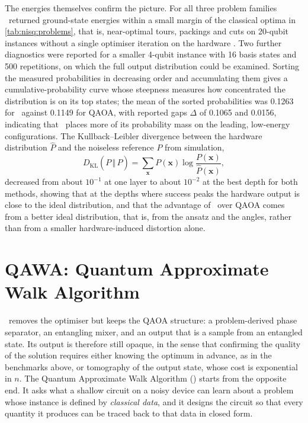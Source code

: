 The energies themselves confirm the picture. For all three problem families \deal\ returned ground-state energies within a small margin of the classical optima in \cref{tab:nisq:problems}, that is, near-optimal tours, packings and cuts on 20-qubit instances without a single optimiser iteration on the hardware \cite{guo2025deal}. Two further diagnostics were reported for a smaller 4-qubit instance with 16 basis states and 500 repetitions, on which the full output distribution could be examined. Sorting the measured probabilities in decreasing order and accumulating them gives a cumulative-probability curve whose steepness measures how concentrated the distribution is on its top states; the mean of the sorted probabilities was 0.1263 for \deal\ against 0.1149 for QAOA, with reported gaps $\Delta$ of 0.1065 and 0.0156, indicating that \deal\ places more of its probability mass on the leading, low-energy configurations. The Kullback--Leibler divergence between the hardware distribution $\hat{P}$ and the noiseless reference $P$ from simulation,
\begin{equation}\label{eq:nisq:kl}
  D_{\mathrm{KL}}(P\,\Vert\,\hat{P}) = \sum_{\bm{x}} P(\bm{x})\log\frac{P(\bm{x})}{\hat{P}(\bm{x})},
\end{equation}
decreased from about $10^{-1}$ at one layer to about $10^{-2}$ at the best depth for both methods, showing that at the depths where success peaks the hardware output is close to the ideal distribution, and that the advantage of \deal\ over QAOA comes from a better ideal distribution, that is, from the ansatz and the angles, rather than from a smaller hardware-induced distortion alone.

\section{QAWA: Quantum Approximate Walk Algorithm}\label{sec:nisq:qawa}

\deal\ removes the optimiser but keeps the QAOA structure: a problem-derived phase separator, an entangling mixer, and an output that is a sample from an entangled state. Its output is therefore still opaque, in the sense that confirming the quality of the solution requires either knowing the optimum in advance, as in the benchmarks above, or tomography of the output state, whose cost is exponential in $n$. The Quantum Approximate Walk Algorithm (\qawa) \cite{guo2025qawa} starts from the opposite end. It asks what a shallow circuit on a noisy device can learn about a problem whose instance is defined by \emph{classical data}, and it designs the circuit so that every quantity it produces can be traced back to that data in closed form.

